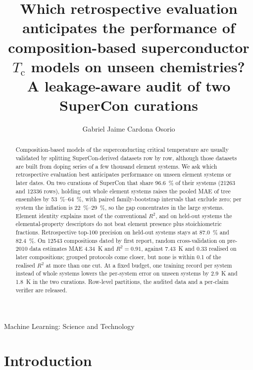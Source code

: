 \documentclass{iopjournal}
\newcommand{\Tc}{T_{\mathrm c}}
\newcommand{\Rsq}{R^{2}}
\renewcommand{\articletype}[1]{{\vspace*{-8mm}\noindent \Large \sf Machine Learning: Science and Technology}
\vspace*{8mm} \noindent\reversemarginpar
\marginpar{\vspace{-3mm} {\color{gray}\hrule} \ \\ {\scriptsize \sf{\bfseries \MakeUppercase{#1}}}}}
\begin{document}
\articletype{Paper}

\title{Which retrospective evaluation anticipates the performance of composition-based
superconductor $\Tc$ models on unseen chemistries? A leakage-aware audit of two SuperCon
curations}

\author{Gabriel Jaime Cardona Osorio}




\begin{abstract}
Composition-based models of the superconducting critical temperature are usually validated by
splitting SuperCon-derived datasets row by row, although those datasets are built from doping series
of a few thousand element systems. We ask which retrospective evaluation best anticipates performance
on unseen element systems or later dates. On two curations of SuperCon that share
\SI{96.6}{\percent} of their systems (\num{21263} and \num{12336} rows), holding out whole element
systems raises the pooled MAE of tree ensembles by \SIrange{53}{64}{\percent}, with paired
family-bootstrap intervals that exclude zero; per system the inflation is \SIrange{22}{29}{\percent},
so the gap concentrates in the large systems. Element identity explains most of the conventional
$\Rsq$, and on held-out systems the elemental-property descriptors do not beat element presence plus
stoichiometric fractions. Retrospective top-\num{100} precision on held-out systems stays at
\SI{87.0}{\percent} and \SI{82.4}{\percent}. On \num{12543} compositions dated by first report,
random cross-validation on pre-2010 data estimates MAE \SI{4.34}{\kelvin} and $\Rsq = \num{0.91}$,
against \SI{7.43}{\kelvin} and \num{0.33} realised on later compositions; grouped protocols come
closer, but none is within \num{0.1} of the realised $\Rsq$ at more than one cut. At a fixed budget,
one training record per system instead of whole systems lowers the per-system error on unseen systems
by \SI{2.9}{\kelvin} and \SI{1.8}{\kelvin} in the two curations. Row-level partitions, the audited data and a
per-claim verifier are released.
\end{abstract}

\section{Introduction}
\end{document}
